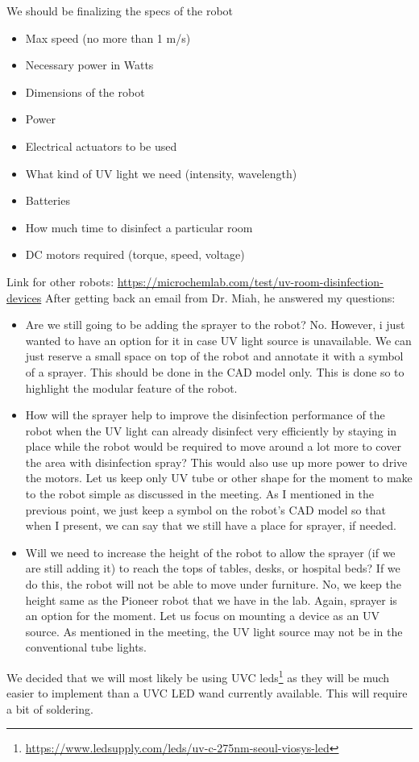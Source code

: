 \documentclass[fontsize=11pt, %
                             paper=a4, %
                             twoside, %
                             captions=tableheading,
                             index=totoc,
                             hyperref]{labbook}
\begin{document}
\begin{addmargin}[0cm]{0cm}
We should be finalizing the specs of the robot
\begin{itemize}
\item Max speed (no more than 1 m/s)
\item Necessary power in Watts
\item Dimensions of the robot
\item Power
\item Electrical actuators to be used
\item What kind of UV light we need (intensity, wavelength)
\item Batteries
\item How much time to disinfect a particular room
\item DC motors required (torque, speed, voltage)
\end{itemize}
Link for other robots:
\url{https://microchemlab.com/test/uv-room-disinfection-devices}
After getting back an email from Dr. Miah, he answered my questions:
\begin{itemize}
\item Are we still going to be adding the sprayer to the robot?\smallbreak\noindent
No. However, i just wanted to have an option for it in case UV light source is unavailable. We can just reserve a small space on top of the robot and annotate it with a symbol of a sprayer. This should be done in the CAD model only.   This is done so to highlight the modular feature of the robot.
\item How will the sprayer help to improve the disinfection performance of the robot when the UV light can already disinfect very efficiently by staying in place while the robot would be required to move around a lot more to cover the area with disinfection spray? This would also use up more power to drive the motors.\smallbreak\noindent 
Let us keep only UV tube or other shape for the moment to make to the robot simple as discussed in the meeting. As I mentioned in the previous point, we just keep a symbol on the robot's CAD model so that when I present, we can say that we still have a place for sprayer, if needed.
\item Will we need to increase the height of the robot to allow the sprayer (if we are still adding it) to reach the tops of tables, desks, or hospital beds? If we do this, the robot will not be able to move under furniture.\smallbreak\noindent
No, we keep the height same as the Pioneer robot that we have in the lab. Again, sprayer is an option for the moment. Let us focus on mounting a device as an UV source. As mentioned in the meeting, the UV light source may not be in the conventional tube lights.
\end{itemize}
We decided that we will most likely be using UVC leds\footnote{\url{https://www.ledsupply.com/leds/uv-c-275nm-seoul-viosys-led}} as they will be much easier to implement than a UVC LED wand currently available. This will require a bit of soldering.


\end{addmargin}
\end{document}
